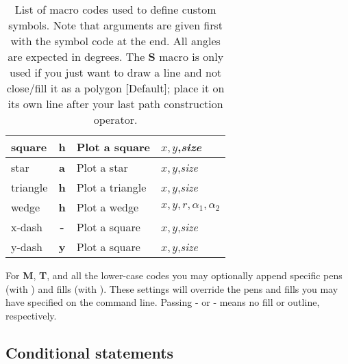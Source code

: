 \begin{table}[H]
\begin{tabular}{|l|c|l|l|}
square		&	{\bf h}	& Plot a square 			& $x, y$,\emph{size}  \\ \hline
star		&	{\bf a}	& Plot a star 				& $x, y$,\emph{size}  \\ \hline
triangle	&	{\bf h}	& Plot a triangle 			& $x, y$,\emph{size}  \\ \hline
wedge		&	{\bf h}	& Plot a wedge 				& $x, y, r, \alpha_1, \alpha_2$  \\ \hline
x-dash		&	{\bf -}	& Plot a square 			& $x, y$,\emph{size}  \\ \hline
y-dash		&	{\bf y}	& Plot a square 			& $x, y$,\emph{size}  \\ \hline
\end{tabular}
\label{tbl:custsymb}
\caption{List of macro codes used to define custom symbols.  Note that arguments are given first with the symbol code at the end.
All angles are expected in degrees. The {\bf S} macro is only used if you just want to draw a line and not close/fill it as
a polygon [Default]; place it on its own line after your last path construction operator.}
\end{table} 
For {\bf M}, {\bf T}, and all the lower-case codes you may optionally append specific pens (with )
and fills (with ).  These settings will override the pens and fills you may have specified
on the command line.  Passing - or - means no fill or outline, respectively.

\subsection{Conditional statements}

